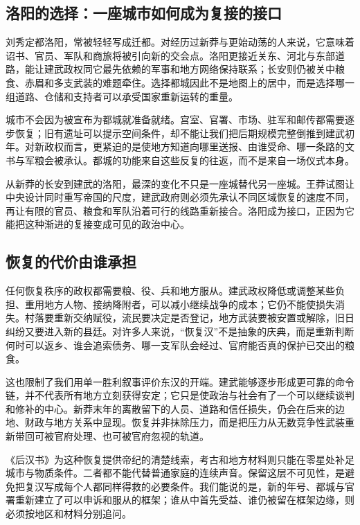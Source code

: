 \subsection{洛阳的选择：一座城市如何成为复接的接口}

刘秀定都洛阳，常被轻轻写成迁都。对经历过新莽与更始动荡的人来说，它意味着诏书、官员、军队和商旅将被引向新的交会点。洛阳更接近关东、河北与东部道路，能让建武政权同它最先依赖的军事和地方网络保持联系；长安则仍被关中粮食、赤眉和多支武装的难题牵住。选择都城因此不是地图上的居中，而是选择哪一组道路、仓储和支持者可以承受国家重新运转的重量。

城市不会因为被宣布为都城就准备就绪。宫室、官署、市场、驻军和邮传都需要逐步恢复；旧有遗址可以提示空间条件，却不能让我们把后期规模完整倒推到建武初年。对新政权而言，更紧迫的是使地方知道向哪里送报、由谁受命、哪一条路的文书与军粮会被承认。都城的功能来自这些反复的往返，而不是来自一场仪式本身。

从新莽的长安到建武的洛阳，最深的变化不只是一座城替代另一座城。王莽试图让中央设计同时重写帝国的尺度，建武政府则必须先承认不同区域恢复的速度不同，再让有限的官员、粮食和军队沿着可行的线路重新接合。洛阳成为接口，正因为它能把这种渐进的复接变成可见的政治中心。

\subsection{恢复的代价由谁承担}

任何恢复秩序的政权都需要粮、役、兵和地方服从。建武政权降低或调整某些负担、重用地方人物、接纳降附者，可以减小继续战争的成本；它仍不能使损失消失。村落要重新交纳赋役，流民要决定是否登记，地方武装要被安置或解除，旧日纠纷又要进入新的县廷。对许多人来说，“恢复汉”不是抽象的庆典，而是重新判断何时可以返乡、谁会追索债务、哪一支军队会经过、官府能否真的保护已交出的粮食。

这也限制了我们用单一胜利叙事评价东汉的开端。建武能够逐步形成更可靠的命令链，并不代表所有地方立刻获得安定；它只是使政治与社会有了一个可以继续谈判和修补的中心。新莽末年的离散留下的人员、道路和信任损失，仍会在后来的边地、财政与地方关系中显现。恢复并非抹除压力，而是把压力从无数竞争性武装重新带回可被官府处理、也可被官府忽视的轨道。

《后汉书》为这种恢复提供帝纪的清楚线索，考古和地方材料则只能在零星处补足城市与物质条件。二者都不能代替普通家庭的连续声音。保留这层不可见性，是避免把复汉写成每个人都同样得救的必要条件。我们能说的是，新的年号、都城与官署重新建立了可以申诉和服从的框架；谁从中首先受益、谁仍被留在框架边缘，则必须按地区和材料分别追问。

